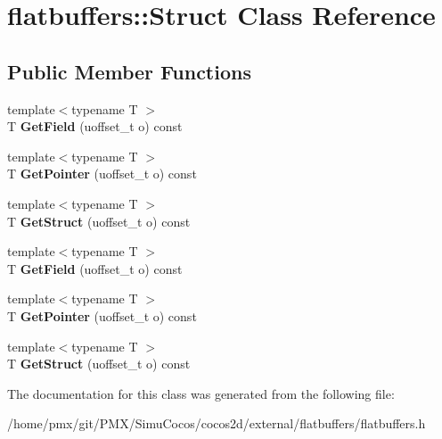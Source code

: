 \hypertarget{classflatbuffers_1_1Struct}{}\section{flatbuffers\+:\+:Struct Class Reference}
\label{classflatbuffers_1_1Struct}
\subsection*{Public Member Functions}
\begin{DoxyCompactItemize}
\item 
\mbox{\label{classflatbuffers_1_1Struct_a57f2484366acde5b71298e351acc76c3}} 
{\footnotesize template$<$typename T $>$ }\\T {\bfseries Get\+Field} (uoffset\+\_\+t o) const
\item 
\mbox{\label{classflatbuffers_1_1Struct_a78e77aad1c50977ea5bb7a1fde28130a}} 
{\footnotesize template$<$typename T $>$ }\\T {\bfseries Get\+Pointer} (uoffset\+\_\+t o) const
\item 
\mbox{\label{classflatbuffers_1_1Struct_aec4ae63bdb15af4a4e126113e27b0de1}} 
{\footnotesize template$<$typename T $>$ }\\T {\bfseries Get\+Struct} (uoffset\+\_\+t o) const
\item 
\mbox{\label{classflatbuffers_1_1Struct_a57f2484366acde5b71298e351acc76c3}} 
{\footnotesize template$<$typename T $>$ }\\T {\bfseries Get\+Field} (uoffset\+\_\+t o) const
\item 
\mbox{\label{classflatbuffers_1_1Struct_a78e77aad1c50977ea5bb7a1fde28130a}} 
{\footnotesize template$<$typename T $>$ }\\T {\bfseries Get\+Pointer} (uoffset\+\_\+t o) const
\item 
\mbox{\label{classflatbuffers_1_1Struct_aec4ae63bdb15af4a4e126113e27b0de1}} 
{\footnotesize template$<$typename T $>$ }\\T {\bfseries Get\+Struct} (uoffset\+\_\+t o) const
\end{DoxyCompactItemize}


The documentation for this class was generated from the following file\+:\begin{DoxyCompactItemize}
\item 
/home/pmx/git/\+P\+M\+X/\+Simu\+Cocos/cocos2d/external/flatbuffers/flatbuffers.\+h\end{DoxyCompactItemize}
